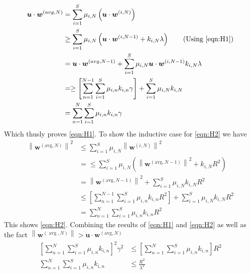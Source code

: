 \begin{align*}
    \bm{u} \cdot \bm{w}^{(avg,N)} &= \sum_{i=1}^{S} \mu_{i,N} \left( \bm{u} \cdot \bm{w}^{(i,N)} \right) \\
    &\geq \sum_{i=1}^{S} \mu_{i,N} \left( \bm{u} \cdot \bm{w}^{(i,N-1)} + k_{i,N} \lambda \right) \tag{Using \ref{eqn:H1}} \\
    &= \bm{u} \cdot \bm{w}^{(avg,N-1)} + \sum_{i=1}^{S} \mu_{i,N} \bm{u} \cdot \bm{w}^{(i,N-1)} k_{i,N} \lambda \\
    &= \geq\left[\sum_{n=1}^{N-1} \sum_{i=1}^{S} \mu_{i, n} k_{i, n} \gamma\right]+\sum_{i=1}^{S} \mu_{i, N} k_{i, N} \\
    &= \sum_{n=1}^{N} \sum_{i=1}^{S} \mu_{i, n} k_{i, n} \gamma
\end{align*}
Which thusly proves \ref{eqn:H1}. To show the inductive case for \ref{eqn:H2} we have
\begin{align*}
    \left\|\mathbf{w}^{(\mathrm{avg}, N)}\right\|^{2} &\leq \sum_{i=1}^{S} \mu_{i, N}\left\|\mathbf{w}^{(i, N)}\right\|^{2} \\
    &= \leq \sum_{i=1}^{S} \mu_{i, N}\left(\left\|\mathbf{w}^{(\mathrm{avg}, N-1)}\right\|^{2}+k_{i, N} R^{2}\right) \\
    &= \left\|\mathbf{w}^{(\mathrm{avg}, N-1)}\right\|^{2}+\sum_{i=1}^{S} \mu_{i, N} k_{i, N} R^{2} \\
    &\leq \left[\sum_{n=1}^{N-1} \sum_{i=1}^{S} \mu_{i, n} k_{i, n} R^{2}\right]+\sum_{i=1}^{S} \mu_{i, N} k_{i, N} R^{2} \\
    &= \sum_{n=1}^{N} \sum_{i=1}^{S} \mu_{i, n} k_{i, n} R^{2}
\end{align*}
This shows \ref{eqn:H2}. Combining the results of \ref{eqn:H1} and \ref{eqn:H2} as well as the fact $\left\|\mathbf{w}^{(\operatorname{avg}, N)}\right\|>\mathbf{u} \cdot \mathbf{w}^{(\mathrm{avg}, N)}$
\begin{align*}
    \left[\sum_{n=1}^{N} \sum_{i=1}^{S} \mu_{i, n} k_{i, n}\right]^{2} \gamma^{2} &\leq \left[\sum_{n=1}^{N} \sum_{i=1}^{S} \mu_{i, n} k_{i, n}\right] R^{2} \\
    \sum_{n=1}^{N} \sum_{i=1}^{S} \mu_{i, n} k_{i, n} &\leq \frac{R^2}{\lambda^2}
\end{align*}